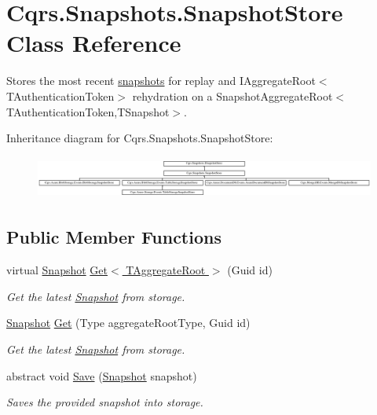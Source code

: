 \hypertarget{classCqrs_1_1Snapshots_1_1SnapshotStore}{}\section{Cqrs.\+Snapshots.\+Snapshot\+Store Class Reference}
\label{classCqrs_1_1Snapshots_1_1SnapshotStore}


Stores the most recent \hyperlink{classCqrs_1_1Snapshots_1_1Snapshot}{snapshots} for replay and I\+Aggregate\+Root$<$\+T\+Authentication\+Token$>$ rehydration on a Snapshot\+Aggregate\+Root$<$\+T\+Authentication\+Token,\+T\+Snapshot$>$.  


Inheritance diagram for Cqrs.\+Snapshots.\+Snapshot\+Store\+:\begin{figure}[H]
\begin{center}
\leavevmode
\includegraphics[height=1.421320cm]{classCqrs_1_1Snapshots_1_1SnapshotStore}
\end{center}
\end{figure}
\subsection*{Public Member Functions}
\begin{DoxyCompactItemize}
\item 
virtual \hyperlink{classCqrs_1_1Snapshots_1_1Snapshot}{Snapshot} \hyperlink{classCqrs_1_1Snapshots_1_1SnapshotStore_af35423c44786c31d224d52c3796d0d3d_af35423c44786c31d224d52c3796d0d3d}{Get$<$ T\+Aggregate\+Root $>$} (Guid id)
\begin{DoxyCompactList}\small\item\em Get the latest \hyperlink{classCqrs_1_1Snapshots_1_1Snapshot}{Snapshot} from storage. \end{DoxyCompactList}\item 
\hyperlink{classCqrs_1_1Snapshots_1_1Snapshot}{Snapshot} \hyperlink{classCqrs_1_1Snapshots_1_1SnapshotStore_a08ec0d8ff97742e3503a3778bb92076e_a08ec0d8ff97742e3503a3778bb92076e}{Get} (Type aggregate\+Root\+Type, Guid id)
\begin{DoxyCompactList}\small\item\em Get the latest \hyperlink{classCqrs_1_1Snapshots_1_1Snapshot}{Snapshot} from storage. \end{DoxyCompactList}\item 
abstract void \hyperlink{classCqrs_1_1Snapshots_1_1SnapshotStore_ae96ea2bb89a0bd7f45544acc37107525_ae96ea2bb89a0bd7f45544acc37107525}{Save} (\hyperlink{classCqrs_1_1Snapshots_1_1Snapshot}{Snapshot} snapshot)
\begin{DoxyCompactList}\small\item\em Saves the provided {\itshape snapshot}  into storage. \end{DoxyCompactList}\end{DoxyCompactItemize}
